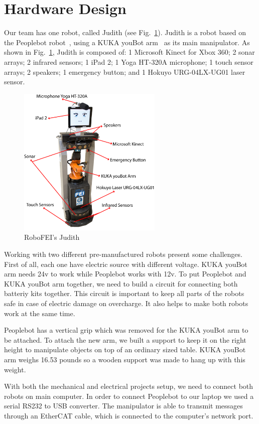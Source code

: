 \section{Hardware Design}

Our team has one robot, called Judith (see Fig.~\ref{fig:judith}). Judith is a robot based on the Peoplebot robot~\cite{peoplebot:2001}, using a KUKA youBot arm~\cite{youbot:2016} as its main manipulator. As shown in Fig.~\ref{fig:judith}, Judith is composed of: 1 Microsoft Kinect for Xbox 360; 2 sonar arrays; 2 infrared sensors; 1 iPad 2; 1 Yoga HT-320A microphone; 1 touch sensor arrays; 2 speakers; 1 emergency button; and 1 Hokuyo URG-04LX-UG01 laser sensor.

\begin{figure}[ht!]
    \centering
    \includegraphics[height = 7.2cm]{figures/judith_info.png}
    \caption{RoboFEI's Judith}
    \label{fig:judith}
\end{figure}

Working with two different pre-manufactured robots present some challenges. First of all, each one have electric source with different voltage. KUKA youBot arm needs 24v to work while Peoplebot works with 12v. To put Peoplebot and KUKA youBot arm together, we need to build a circuit for connecting both batteriy kits together. This circuit is important to keep all parts of the robots safe in case of electric damage on overcharge. It also helps to make both robots work at the same time.

Peoplebot has a vertical grip which was removed for the KUKA youBot arm to be attached. To attach the new arm, we built a support to keep it on the right height to manipulate objects on top of an ordinary sized table. KUKA youBot arm weighs 16.53 pounds so a wooden support was made to hang up with this weight.

With both the mechanical and electrical projects setup, we need to connect both robots on main computer. In order to connect Peoplebot to our laptop we used a serial RS232 to USB converter. The manipulator is able to transmit messages through an EtherCAT cable, which is connected to the computer's network port.

